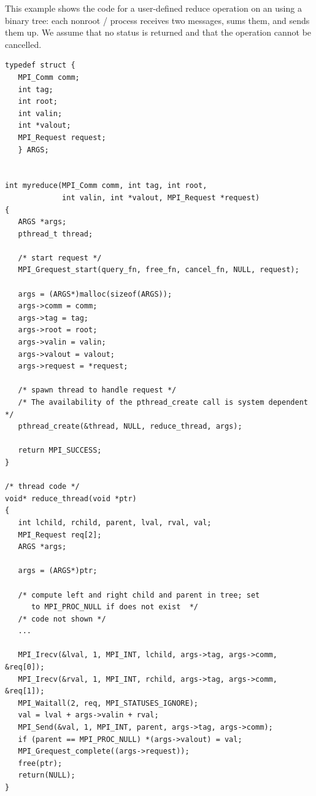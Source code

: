 \begin{example}
%
This example shows the code for a user-defined reduce operation on an
 using
a binary tree: each nonroot \MPI/ process receives two messages, sums them, 
and sends them up.  We assume that no status is returned and that the
operation cannot be cancelled.

\begin{lstlisting}[language={[MPI]C}]
typedef struct {
   MPI_Comm comm;
   int tag;
   int root;
   int valin;
   int *valout;
   MPI_Request request;
   } ARGS;


int myreduce(MPI_Comm comm, int tag, int root,
             int valin, int *valout, MPI_Request *request)
{
   ARGS *args;
   pthread_t thread;
   
   /* start request */
   MPI_Grequest_start(query_fn, free_fn, cancel_fn, NULL, request);
   
   args = (ARGS*)malloc(sizeof(ARGS));
   args->comm = comm;
   args->tag = tag;
   args->root = root;
   args->valin = valin;
   args->valout = valout;
   args->request = *request;
   
   /* spawn thread to handle request */
   /* The availability of the pthread_create call is system dependent */
   pthread_create(&thread, NULL, reduce_thread, args);
   
   return MPI_SUCCESS;
}

/* thread code */
void* reduce_thread(void *ptr) 
{
   int lchild, rchild, parent, lval, rval, val;
   MPI_Request req[2];
   ARGS *args;
   
   args = (ARGS*)ptr;
   
   /* compute left and right child and parent in tree; set 
      to MPI_PROC_NULL if does not exist  */
   /* code not shown */
   ...
     
   MPI_Irecv(&lval, 1, MPI_INT, lchild, args->tag, args->comm, &req[0]);
   MPI_Irecv(&rval, 1, MPI_INT, rchild, args->tag, args->comm, &req[1]);
   MPI_Waitall(2, req, MPI_STATUSES_IGNORE);
   val = lval + args->valin + rval;
   MPI_Send(&val, 1, MPI_INT, parent, args->tag, args->comm);
   if (parent == MPI_PROC_NULL) *(args->valout) = val;
   MPI_Grequest_complete((args->request));   
   free(ptr);
   return(NULL);
}


\end{lstlisting}
\end{example}
